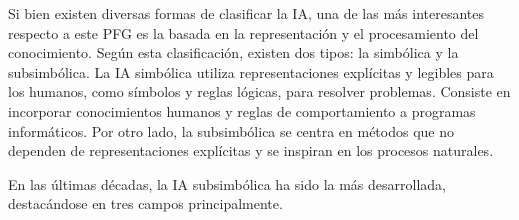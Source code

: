 Si bien existen diversas formas de clasificar la IA, una de las más interesantes respecto a este PFG es la basada en la representación y el procesamiento del conocimiento. Según esta clasificación, existen dos tipos: la simbólica y la subsimbólica. La IA simbólica utiliza representaciones explícitas y legibles para los humanos, como símbolos y reglas lógicas, para resolver problemas. Consiste en incorporar conocimientos humanos y reglas de comportamiento a programas informáticos. Por otro lado, la subsimbólica se centra en métodos que no dependen de representaciones explícitas y se inspiran en los procesos naturales.

En las últimas décadas, la IA subsimbólica ha sido la más desarrollada, destacándose en tres campos principalmente.

